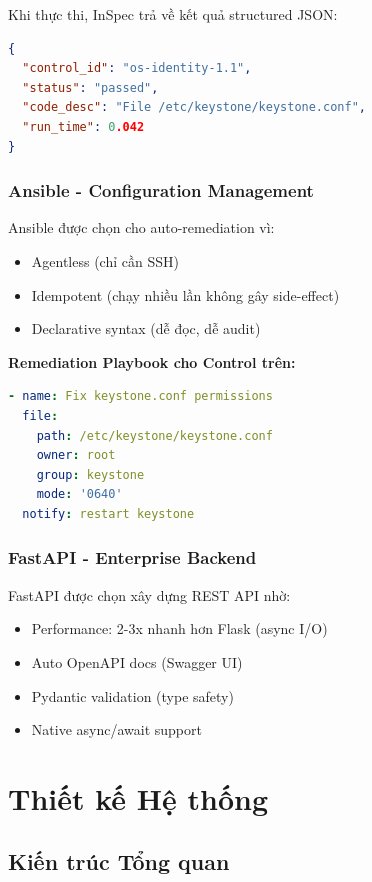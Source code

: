 \documentclass[12pt,a4paper]{report}
\begin{document}
Khi thực thi, InSpec trả về kết quả structured JSON:
\begin{lstlisting}[language=JSON]
{
  "control_id": "os-identity-1.1",
  "status": "passed",
  "code_desc": "File /etc/keystone/keystone.conf",
  "run_time": 0.042
}
\end{lstlisting}

\subsection{Ansible - Configuration Management}

Ansible được chọn cho auto-remediation vì:
\begin{itemize}
    \item Agentless (chỉ cần SSH)
    \item Idempotent (chạy nhiều lần không gây side-effect)
    \item Declarative syntax (dễ đọc, dễ audit)
\end{itemize}

\textbf{Remediation Playbook cho Control trên:}
\begin{lstlisting}[language=YAML, caption=Ansible Task sửa quyền Keystone config]
- name: Fix keystone.conf permissions
  file:
    path: /etc/keystone/keystone.conf
    owner: root
    group: keystone
    mode: '0640'
  notify: restart keystone
\end{lstlisting}

\subsection{FastAPI - Enterprise Backend}

FastAPI được chọn xây dựng REST API nhờ:
\begin{itemize}
    \item Performance: 2-3x nhanh hơn Flask (async I/O)
    \item Auto OpenAPI docs (Swagger UI)
    \item Pydantic validation (type safety)
    \item Native async/await support
\end{itemize}

\chapter{Thiết kế Hệ thống}

\section{Kiến trúc Tổng quan}
\end{document}
